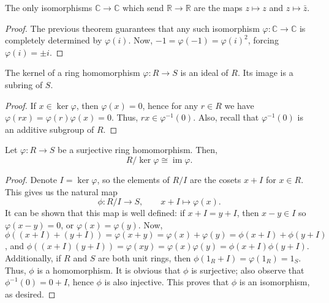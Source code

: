 \documentclass[11pt]{article}
\newcommand{\C}{\mathbb{C}}
\newcommand{\R}{\mathbb{R}}
\DeclareMathOperator{\im}{im}
\theoremstyle{definition}
\theoremstyle{remark}
\numberwithin{equation}{section}
\begin{document}
    \begin{theorem}
        The only isomorphisms $\C \to \C$ which send $\R \to \R$ are the maps $z
        \mapsto z$ and $z \mapsto \bar{z}$.
    \end{theorem}
    \begin{proof}
        The previous theorem guarantees that any such isomorphism $\varphi\colon \C
        \to \C$ is completely determined by $\varphi(i)$. Now, $-1 = \varphi(-1) =
        \varphi(i)^2$, forcing $\varphi(i) = \pm i$.
    \end{proof}

    \begin{lemma}
        The kernel of a ring homomorphism $\varphi\colon R \to S$ is an ideal of $R$.
        Its image is a subring of $S$.
    \end{lemma}
    \begin{proof}
        If $x \in \ker\varphi$, then $\varphi(x) = 0$, hence for any $r \in R$ we
        have $\varphi(rx) = \varphi(r) \varphi(x) = 0$. Thus, $rx \in
        \varphi^{-1}(0)$. Also, recall that $\varphi^{-1}(0)$ is an additive subgroup
        of $R$.
    \end{proof}

    \begin{theorem}
        Let $\varphi\colon R \to S$ be a surjective ring homomorphism. Then, \[
            R / \ker{\varphi} \cong \im{\varphi}.
        \] 
    \end{theorem}
    \begin{proof}
        Denote $I = \ker{\varphi}$, so the elements of $R/I$ are the cosets $x + I$
        for $x \in R$. This gives us the natural map \[
            \phi\colon R/I \to S, \qquad x + I \mapsto \varphi(x).
        \] It can be shown that this map is well defined: if $x + I = y + I$, then $x
        - y \in I$ so $\varphi(x - y) = 0$, or $\varphi(x) = \varphi(y)$. Now,
        $\phi((x + I) + (y + I)) = \varphi(x + y) = \varphi(x) + \varphi(y) = \phi(x
        + I) + \phi(y + I)$, and $\phi((x + I)(y + I)) = \varphi(xy) =
        \varphi(x)\varphi(y) = \phi(x + I)\phi(y + I)$. Additionally, if $R$ and $S$
        are both unit rings, then $\phi(1_R + I) = \varphi(1_R) = 1_S$. Thus, $\phi$
        is a homomorphism. It is obvious that $\phi$ is surjective; also observe that
        $\phi^{-1}(0) = 0 + I$, hence $\phi$ is also injective. This proves that
        $\phi$ is an isomorphism, as desired.
    \end{proof}
\end{document}
